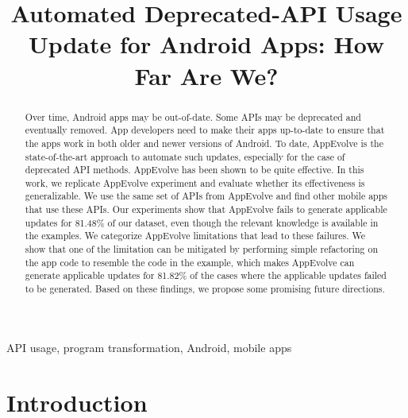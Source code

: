 \documentclass[conference]{IEEEtran}
\begin{document}
\def \toolname {AppEvolve}
\title{Automated Deprecated-API Usage Update for Android Apps: How Far Are We?}

\maketitle

\begin{abstract}
Over time, Android apps may be out-of-date. Some APIs may be deprecated and eventually removed. App developers need to make their apps up-to-date to ensure that the apps work in both older and newer versions of Android. %
To date, AppEvolve is the state-of-the-art approach to automate such updates, especially for the case of deprecated API methods. AppEvolve has been shown to be quite effective. %
In this work, we replicate AppEvolve experiment and evaluate whether its effectiveness is generalizable. We use the same set of APIs from AppEvolve and find other mobile apps that use these APIs. Our experiments show that AppEvolve fails to generate applicable updates for 81.48\% of our dataset, even though the relevant knowledge is available in the examples. We categorize AppEvolve limitations that lead to these failures. %
We show that one of the limitation can be mitigated by performing simple refactoring on the app code to resemble the code in the example, which makes AppEvolve can generate applicable updates for 81.82\% of the cases where the applicable updates failed to be generated. Based on these findings, we propose some promising future directions. 

\end{abstract}

\begin{IEEEkeywords}
API usage, program transformation, Android, mobile apps
\end{IEEEkeywords}

\section{Introduction}

\end{document}
